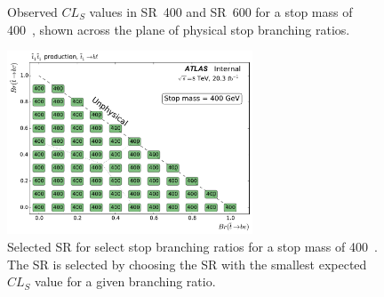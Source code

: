 \begin{figure}[ht]
  \centering
  \caption{
    Observed $CL_S$ values in SR~400 and SR~600 for a stop mass of 400~\GeV,
    shown across the plane of physical stop branching ratios.
  }
\end{figure}

\begin{figure}[ht]
  \centering
  \includegraphics[width=0.65\textwidth]
    {figs/blstop/region_selection/region_choice_vs_br_m_400.pdf}
  \caption{
    Selected SR for select stop branching ratios for a stop mass of 400~\GeV.
    The SR is selected by choosing the SR with the smallest expected $CL_S$
    value for a given branching ratio.
  }
\end{figure}

